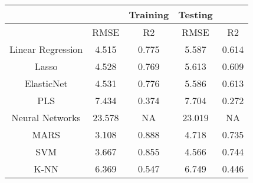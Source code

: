 \documentclass[12pt]{article}
\begin{document}
\begin{table}[ht]

\centering %

\begin{tabular}{c c c c c} %

\hline %

& & Training & Testing \\ [0.5ex] %

\hline %

& RMSE & R2 & RMSE & R2 \\ [0.5ex] %

\hline %

Linear Regression & 4.515 & 0.775 & 5.587  & 0.614 \\ [0.5ex] %

\hline %

Lasso & 4.528 & 0.769 & 5.613 & 0.609\\ [0.5ex] %

\hline %

ElasticNet &  4.531 & 0.776 &  5.586 & 0.613\\ [0.5ex] %
\hline %

PLS & 7.434 & 0.374 & 7.704 & 0.272\\ [0.5ex] %
\hline %

Neural Networks & 23.578 &  NA &  23.019 & NA \\ [0.5ex] %

\hline %

MARS & 3.108 &  0.888 & 4.718 & 0.735\\ [0.5ex] %

\hline %

SVM & 3.667 & 0.855 & 4.566 & 0.744\\ [0.5ex] %

\hline %

K-NN &  6.369 & 0.547 & 6.749 & 0.446\\ [0.5ex] %

\hline %

\end{tabular}

\label{table:nonlin} %

\end{table}
\end{document}
